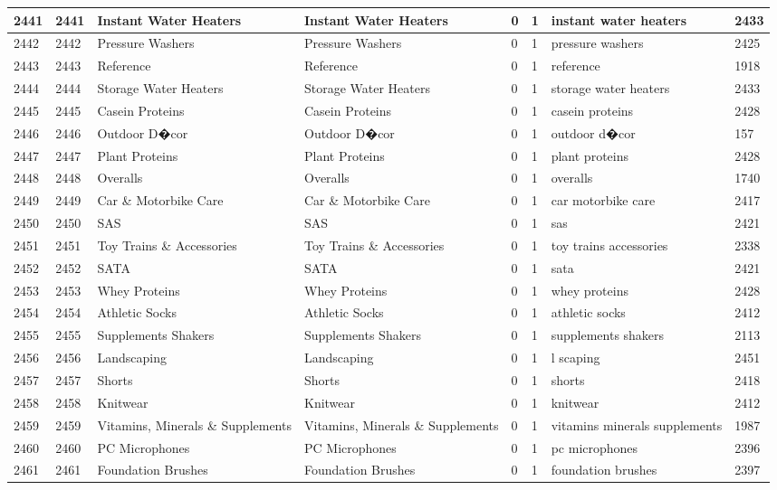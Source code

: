 \begin{longtable}{|l|l|l|l|l|l|l|l|}
2441 & 2441 & Instant Water Heaters & Instant Water Heaters & 0 & 1 & instant water heaters & 2433 \\ \hline 
2442 & 2442 & Pressure Washers & Pressure Washers & 0 & 1 & pressure washers & 2425 \\ \hline 
2443 & 2443 & Reference & Reference & 0 & 1 & reference & 1918 \\ \hline 
2444 & 2444 & Storage Water Heaters & Storage Water Heaters & 0 & 1 & storage water heaters & 2433 \\ \hline 
2445 & 2445 & Casein Proteins & Casein Proteins & 0 & 1 & casein proteins & 2428 \\ \hline 
2446 & 2446 & Outdoor D�cor & Outdoor D�cor & 0 & 1 & outdoor d�cor & 157 \\ \hline 
2447 & 2447 & Plant Proteins & Plant Proteins & 0 & 1 & plant proteins & 2428 \\ \hline 
2448 & 2448 & Overalls & Overalls & 0 & 1 & overalls & 1740 \\ \hline 
2449 & 2449 & Car \& Motorbike Care & Car \& Motorbike Care & 0 & 1 & car motorbike care & 2417 \\ \hline 
2450 & 2450 & SAS & SAS & 0 & 1 & sas & 2421 \\ \hline 
2451 & 2451 & Toy Trains \& Accessories & Toy Trains \& Accessories & 0 & 1 & toy trains accessories & 2338 \\ \hline 
2452 & 2452 & SATA & SATA & 0 & 1 & sata & 2421 \\ \hline 
2453 & 2453 & Whey Proteins & Whey Proteins & 0 & 1 & whey proteins & 2428 \\ \hline 
2454 & 2454 & Athletic Socks & Athletic Socks & 0 & 1 & athletic socks & 2412 \\ \hline 
2455 & 2455 & Supplements Shakers & Supplements Shakers & 0 & 1 & supplements shakers & 2113 \\ \hline 
2456 & 2456 & Landscaping & Landscaping & 0 & 1 & l scaping & 2451 \\ \hline 
2457 & 2457 & Shorts & Shorts & 0 & 1 & shorts & 2418 \\ \hline 
2458 & 2458 & Knitwear & Knitwear & 0 & 1 & knitwear & 2412 \\ \hline 
2459 & 2459 & Vitamins, Minerals \& Supplements & Vitamins, Minerals \& Supplements & 0 & 1 & vitamins minerals supplements & 1987 \\ \hline 
2460 & 2460 & PC Microphones & PC Microphones & 0 & 1 & pc microphones & 2396 \\ \hline 
2461 & 2461 & Foundation Brushes & Foundation Brushes & 0 & 1 & foundation brushes & 2397 \\ \hline 

\end{longtable}
